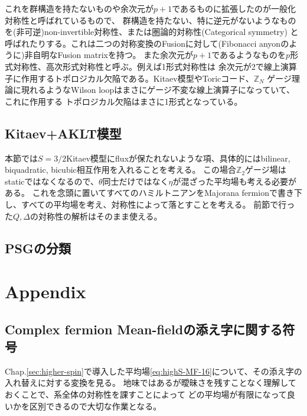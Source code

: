 \documentclass[11pt, aps, longbibliography]{article}
\begin{document}
        これを群構造を持たないものや余次元が$p+1$であるものに拡張したのが一般化対称性と呼ばれているもので、
        群構造を持たない、特に逆元がないようなものを(非可逆)non-invertible対称性、または圏論的対称性(Categorical symmetry)
        と呼ばれたりする。これは二つの対称変換のFusionに対して(Fibonacci anyonのように)非自明なFusion matrixを持つ。
        また余次元が$p+1$であるようなものを$p$形式対称性、高次形式対称性と呼ぶ。例えば1形式対称性は
        余次元が2で線上演算子に作用するトポロジカル欠陥である。Kitaev模型やToricコード、$\mathbb{Z}_N$
        ゲージ理論に現れるようなWilson loopはまさにゲージ不変な線上演算子になっていて、これに作用する
        トポロジカル欠陥はまさに1形式となっている。


    \subsection{Kitaev+AKLT模型}
    本節では$S=3/2$Kitaev模型にfluxが保たれないような項、具体的にはbilinear, biquadratic, bicubic相互作用を入れることを考える。
    この場合$\mathbb{Z}_2$ゲージ場はstaticではなくなるので、$\theta$同士だけではなく$\eta$が混ざった平均場も考える必要がある。
    これを念頭に置いてすべてのハミルトニアンをMajorana fermionで書き下し、すべての平均場を考え、対称性によって落とすことを考える。
    前節で行った$Q, \Delta$の対称性の解析はそのまま使える。
    \subsection{PSGの分類}

\newpage

\appendix

\section{Appendix}
    \subsection{Complex fermion Mean-fieldの添え字に関する符号}\label{sec:app1}\hypertarget{app_mf1}{}
        Chap.\ref{sec:higher-spin}で導入した平均場\eqref{eq:highS-MF-16}について、その添え字の入れ替えに対する変換を見る。
        地味ではあるが曖昧さを残すことなく理解しておくことで、系全体の対称性を課すことによって
        どの平均場が有限になって良いかを区別できるので大切な作業となる。
        
\end{document}
